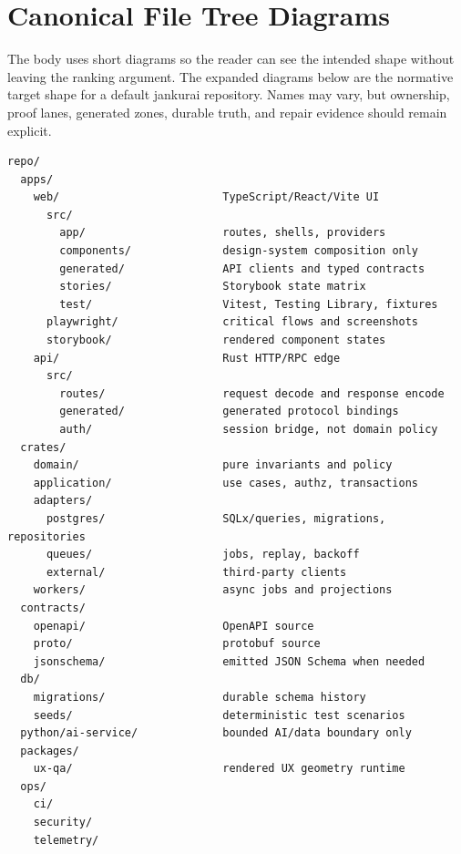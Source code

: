 \section{Canonical File Tree Diagrams}

The body uses short diagrams so the reader can see the intended shape without leaving the ranking argument. The expanded diagrams below are the normative target shape for a default jankurai repository. Names may vary, but ownership, proof lanes, generated zones, durable truth, and repair evidence should remain explicit.

\begin{lstlisting}[style=codebox]
repo/
  apps/
    web/                         TypeScript/React/Vite UI
      src/
        app/                     routes, shells, providers
        components/              design-system composition only
        generated/               API clients and typed contracts
        stories/                 Storybook state matrix
        test/                    Vitest, Testing Library, fixtures
      playwright/                critical flows and screenshots
      storybook/                 rendered component states
    api/                         Rust HTTP/RPC edge
      src/
        routes/                  request decode and response encode
        generated/               generated protocol bindings
        auth/                    session bridge, not domain policy
  crates/
    domain/                      pure invariants and policy
    application/                 use cases, authz, transactions
    adapters/
      postgres/                  SQLx/queries, migrations, repositories
      queues/                    jobs, replay, backoff
      external/                  third-party clients
    workers/                     async jobs and projections
  contracts/
    openapi/                     OpenAPI source
    proto/                       protobuf source
    jsonschema/                  emitted JSON Schema when needed
  db/
    migrations/                  durable schema history
    seeds/                       deterministic test scenarios
  python/ai-service/             bounded AI/data boundary only
  packages/
    ux-qa/                       rendered UX geometry runtime
  ops/
    ci/
    security/
    telemetry/
\end{lstlisting}

